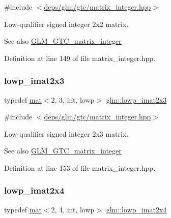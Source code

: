 {\ttfamily \#include $<$\hyperlink{matrix__integer_8hpp}{deps/glm/gtc/matrix\+\_\+integer.\+hpp}$>$}

Low-\/qualifier signed integer 2x2 matrix. \begin{DoxySeeAlso}{See also}
\hyperlink{group__gtc__matrix__integer}{G\+L\+M\+\_\+\+G\+T\+C\+\_\+matrix\+\_\+integer} 
\end{DoxySeeAlso}


Definition at line 149 of file matrix\+\_\+integer.\+hpp.

\mbox{\label{group__gtc__matrix__integer_ga4b3b731b3f8ad88feee31e945c3618ca}} 
\subsubsection{\texorpdfstring{lowp\+\_\+imat2x3}{lowp\_imat2x3}}
{\footnotesize\ttfamily typedef \hyperlink{structglm_1_1mat}{mat}$<$2, 3, int, lowp$>$ \hyperlink{group__gtc__matrix__integer_ga4b3b731b3f8ad88feee31e945c3618ca}{glm\+::lowp\+\_\+imat2x3}}



{\ttfamily \#include $<$\hyperlink{matrix__integer_8hpp}{deps/glm/gtc/matrix\+\_\+integer.\+hpp}$>$}

Low-\/qualifier signed integer 2x3 matrix. \begin{DoxySeeAlso}{See also}
\hyperlink{group__gtc__matrix__integer}{G\+L\+M\+\_\+\+G\+T\+C\+\_\+matrix\+\_\+integer} 
\end{DoxySeeAlso}


Definition at line 153 of file matrix\+\_\+integer.\+hpp.

\mbox{\label{group__gtc__matrix__integer_gabd8679c1108586fa89539a8bf029ad57}} 
\subsubsection{\texorpdfstring{lowp\+\_\+imat2x4}{lowp\_imat2x4}}
{\footnotesize\ttfamily typedef \hyperlink{structglm_1_1mat}{mat}$<$2, 4, int, lowp$>$ \hyperlink{group__gtc__matrix__integer_gabd8679c1108586fa89539a8bf029ad57}{glm\+::lowp\+\_\+imat2x4}}



